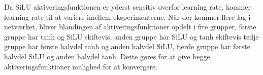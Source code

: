 Da SiLU aktiveringsfunktionen er yderst sensitiv overfor learning rate, kommer learning rate til at variere imellem eksperimenterne. Når der kommer
flere lag i netværket, bliver blandingen af aktiveringsfunktioner opdelt i fire grupper, første gruppe har tanh og SiLU skiftevis, 
anden gruppe har SiLU og tanh skiftevis tedje gruppe har første halvdel tanh og anden halvdel SiLU, fjerde gruppe har første halvdel SiLU og anden halvdel tanh.
Dette gøres for at give begge aktiveringsfunktioner mulighed for at konvergere.
